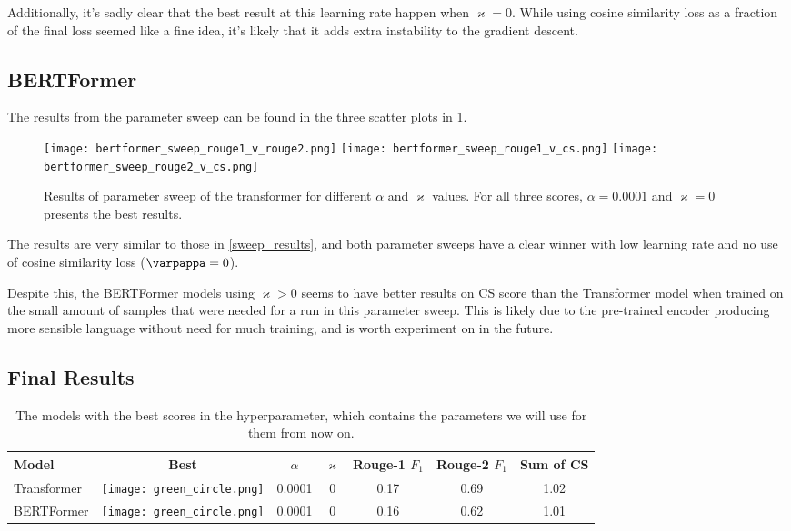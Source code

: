 Additionally, it's sadly clear that the best result at this learning rate happen when $\varkappa = 0$.
While using cosine similarity loss as a fraction of the final loss seemed like a fine idea, it's likely that it adds extra instability to the gradient descent.

\subsection{BERTFormer}

The results from the parameter sweep can be found in the three scatter plots in \cref{bertformer_sweep_results}.

\begin{figure}[h]
	\centering
	\texttt{[image: bertformer\_sweep\_rouge1\_v\_rouge2.png]} \hfill{}
	\texttt{[image: bertformer\_sweep\_rouge1\_v\_cs.png]} \hfill{}
	\texttt{[image: bertformer\_sweep\_rouge2\_v\_cs.png]}
	\caption{Results of parameter sweep of the transformer for different $\alpha$ and $\varkappa$ values. For all three scores, $\alpha = 0.0001$ and $\varkappa = 0$ presents the best results.}
	\label{bertformer_sweep_results}
	\vspace{-7pt}
\end{figure}

The results are very similar to those in \cref{sweep_results}, and both parameter sweeps have a clear winner with low learning rate and no use of cosine similarity loss ($\varpappa = 0$).

Despite this, the BERTFormer models using $\varkappa > 0$ seems to have better results on CS score than the Transformer model when trained on the small amount of samples that were needed for a run in this parameter sweep.
This is likely due to the pre-trained encoder producing more sensible language without need for much training, and is worth experiment on in the future.

\subsection{Final Results}

\begin{table}[h]
	\centering
	\begin{tabular}{l c | c c | c c c}
		\toprule
			Model & Best & $\alpha$ & $\varkappa$ & Rouge-1 $F_1$ & Rouge-2 $F_1$ & Sum of CS \\
		\midrule
			Transformer & \texttt{[image: green\_circle.png]} & 0.0001 & 0 & 0.17 & 0.69 & 1.02 \\
			BERTFormer & \texttt{[image: green\_circle.png]} & 0.0001 & 0 & 0.16 & 0.62 & 1.01 \\
		\bottomrule
	\end{tabular}
	\caption{The models with the best scores in the hyperparameter, which contains the parameters we will use for them from now on.}
\end{table}


